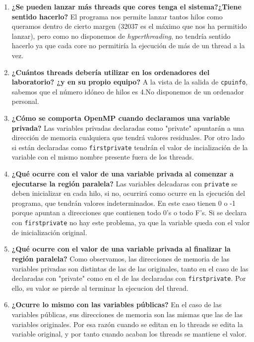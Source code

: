 \documentclass{report}
\newcommand\tab[1][0.6cm]{\hspace*{#1}}
\newcommand\nl{\newline\tab}
\begin{document}
	\begin{enumerate}
		\item{\textbf{\tab ¿Se	pueden	lanzar	más	threads	que	cores	tenga	el	sistema?¿Tiene	sentido	hacerlo?}	\nl El programa nos permite lanzar tantos hilos como queramos dentro de cierto margen (32037 es el máximo que nos ha permitido lanzar), pero como no disponemos de \textit{hyperthreading}, no tendría sentido hacerlo ya que cada core no permitiría la ejecución de más de un thread a la vez.}
		\item{\textbf { \tab ¿Cuántos	threads	debería	utilizar	en	los	ordenadores	del	laboratorio?	¿y	en	su	propio	equipo?	} \nl 
			A la vista de la salida de \texttt{cpuinfo}, sabemos que el número idóneo de hilos es 4.\nl No disponemos de un ordenador personal.}
		\item{\textbf {\tab ¿Cómo se comporta OpenMP	cuando	declaramos	una	variable	privada?		} \nl Las variables privadas declaradas como "private" apuntarán a una dirección de memoria cualquiera que tendrá valores residuales. Por otro lado si están declaradas como \texttt{firstprivate} tendrán el valor de incialización de la variable con el mismo nombre presente fuera de los threads. }
		\item{\textbf {\tab ¿Qué ocurre	con	el valor de una variable privada al comenzar a	ejecutarse	la región paralela? } \nl Las variables delcadaras con \texttt{private} se deben inicializar en cada hilo, si no, ocurrirá como ocurre en la ejecución del programa, que tendrán valores indeterminados. En este caso tienen 0 o -1 porque apuntan a direcciones que contienen todo 0's o todo F's. Si se declara con \texttt{firstprivate} no hay este problema, ya que la variable queda con el valor de inicialización original.}
		\item{\textbf {\tab ¿Qué	ocurre	con	el	valor	de	una	variable	privada	al	finalizar	la	región	paralela?		} \nl Como observamos, las direcciones de memoria de las variables privadas son distintas de las de las originales, tanto en el caso de las declaradas con "private" como en el de las declaradas con \texttt{firstprivate}. Por ello, su valor se pierde al terminar la ejecucion del thread.}
		\item{\textbf {\tab ¿Ocurre	lo	mismo	con	las	variables	públicas?		} \nl 
			En el caso de las variables públicas, sus direcciones de memoria son las mismas que las de las variables originales. Por esa razón cuando se editan en lo threads se edita la variable original, y por tanto cuando acaban los threads se mantiene el valor.}
		
	\end{enumerate}
	
\end{document}
